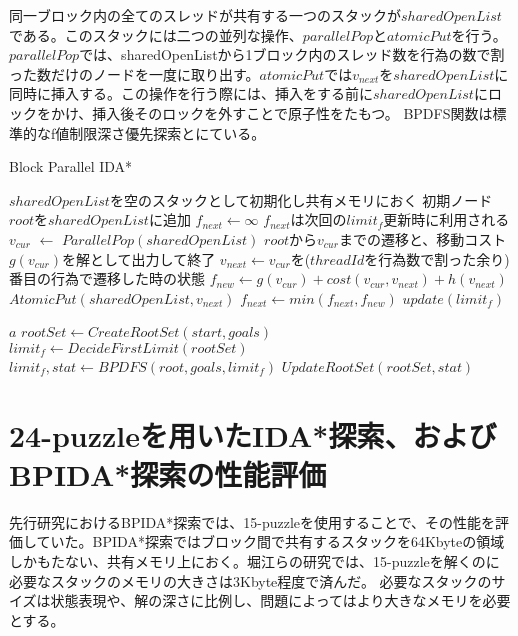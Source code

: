 \documentclass[a4paper,11pt,oneside,openany]{jsbook}
\begin{document}
同一ブロック内の全てのスレッドが共有する一つのスタックが$sharedOpenList$である。このスタックには二つの並列な操作、$parallelPop$と$atomicPut$を行う。$parallelPop$では、sharedOpenListから1ブロック内のスレッド数を行為の数で割った数だけのノードを一度に取り出す。$atomicPut$では$v_{next}$を$sharedOpenList$に同時に挿入する。この操作を行う際には、挿入をする前に$sharedOpenList$にロックをかけ、挿入後そのロックを外すことで原子性をたもつ。
BPDFS関数は標準的なf値制限深さ優先探索とにている。




\newpage
\begin{algorithm}
\caption{Block Parallel IDA*}
\label{alg:pbnf}
\begin{algorithmic}[1]
    \State $sharedOpenList$を空のスタックとして初期化し共有メモリにおく
    \State 初期ノード$root$を$sharedOpenList$に追加
    \State $f_{next} \leftarrow \infty$
    \State $f_{next}$は次回の$limit_f$更新時に利用される 
        \State $v_{cur}$ $\leftarrow$ ${ParallelPop}(sharedOpenList)$
            \State $root$から$v_{cur}$までの遷移と、移動コスト$g(v_{cur})$を解として出力して終了
        \EndIf
        \State $v_{next} \gets $$v_{cur}$を($threadId$を行為数で割った余り)番目の行為で遷移した時の状態
        \State $f_{new} \leftarrow g(v_{cur}) + cost(v_{cur}, v_{next}) + h(v_{next})$
            \State ${AtomicPut}(sharedOpenList, v_{next})$ 
        \Else
            \State $f_{next} \leftarrow min(f_{next}, f_{new})$
        \EndIf
    \EndWhile
    \State $update(limit_f)$

    \State \Return $a$
\EndFunction
{}
    \State $rootSet \gets {CreateRootSet}(start, goals)$
    \State $limit_f \leftarrow {DecideFirstLimit}(rootSet)$
            \State $limit_f, stat \gets {BPDFS}(root, goals, limit_f)$
        \EndParallelForByBlocks
        \State $UpdateRootSet(rootSet, stat)$
    \EndWhile
\EndFunction

\end{algorithmic}
\end{algorithm}
\newpage

\section{24-puzzleを用いたIDA*探索、およびBPIDA*探索の性能評価}
先行研究におけるBPIDA*探索\cite{Horie17}では、15-puzzleを使用することで、その性能を評価していた。BPIDA*探索ではブロック間で共有するスタックを64Kbyteの領域しかもたない、共有メモリ上におく。堀江らの研究では、15-puzzleを解くのに必要なスタックのメモリの大きさは3Kbyte程度で済んだ。
必要なスタックのサイズは状態表現や、解の深さに比例し、問題によってはより大きなメモリを必要とする。
\end{document}
